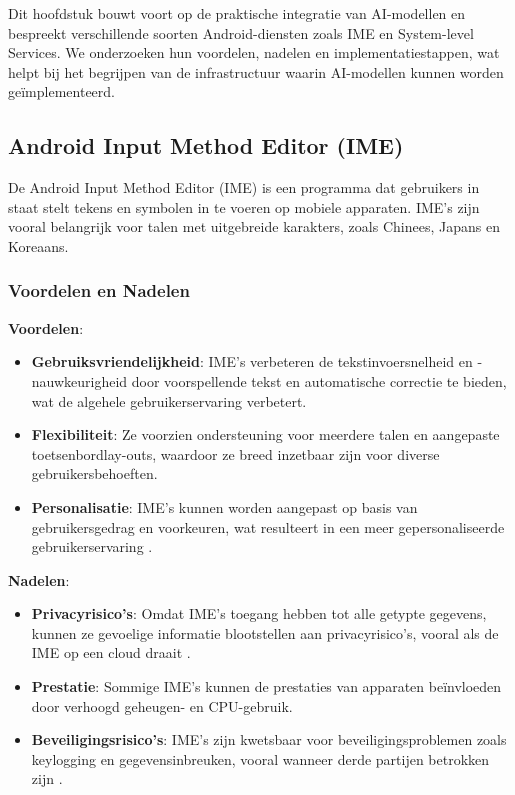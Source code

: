 Dit hoofdstuk bouwt voort op de praktische integratie van AI-modellen en bespreekt verschillende soorten Android-diensten zoals IME en System-level Services. We onderzoeken hun voordelen, nadelen en implementatiestappen, wat helpt bij het begrijpen van de infrastructuur waarin AI-modellen kunnen worden geïmplementeerd.


\subsection{Android Input Method Editor (IME)}

De Android Input Method Editor (IME) is een programma dat gebruikers in staat stelt tekens en symbolen in te voeren op mobiele apparaten. IME's zijn vooral belangrijk voor talen met uitgebreide karakters, zoals Chinees, Japans en Koreaans.

\subsubsection{Voordelen en Nadelen}

\textbf{Voordelen}:
\begin{itemize}
    \item \textbf{Gebruiksvriendelijkheid}: IME's verbeteren de tekstinvoersnelheid en -nauw\-keu\-rig\-heid door voorspellende tekst en automatische correctie te bieden, wat de algehele gebruikerservaring verbetert.
    \item \textbf{Flexibiliteit}: Ze voorzien ondersteuning voor meerdere talen en aangepaste toetsenbordlay-outs, waardoor ze breed inzetbaar zijn voor diverse gebruikersbehoeften.
    \item \textbf{Personalisatie}: IME's kunnen worden aangepast op basis van gebruikersgedrag en voorkeuren, wat resulteert in een meer gepersonaliseerde gebruikerservaring \autocite{Jo2015}.
\end{itemize}

\textbf{Nadelen}:
\begin{itemize}
    \item \textbf{Privacyrisico's}: Omdat IME's toegang hebben tot alle getypte gegevens, kunnen ze gevoelige informatie blootstellen aan privacyrisico's, vooral als de IME op een cloud draait \autocite{Kawamoto2014}.
    \item \textbf{Prestatie}: Sommige IME's kunnen de prestaties van apparaten beïnvloeden door verhoogd geheugen- en CPU-gebruik.
    \item \textbf{Beveiligingsrisico's}: IME's zijn kwetsbaar voor beveiligingsproblemen zoals keylogging en gegevensinbreuken, vooral wanneer derde partijen betrokken zijn \autocite{Diao2015}.
\end{itemize}

